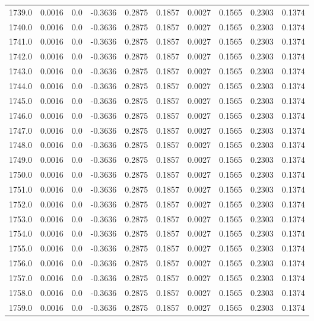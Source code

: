 \begin{longtable}{lrrrrrrrrr}
1739.0 & 0.0016 & 0.0 & -0.3636 & 0.2875 & 0.1857 & 0.0027 & 0.1565 & 0.2303 & 0.1374 \\
1740.0 & 0.0016 & 0.0 & -0.3636 & 0.2875 & 0.1857 & 0.0027 & 0.1565 & 0.2303 & 0.1374 \\
1741.0 & 0.0016 & 0.0 & -0.3636 & 0.2875 & 0.1857 & 0.0027 & 0.1565 & 0.2303 & 0.1374 \\
1742.0 & 0.0016 & 0.0 & -0.3636 & 0.2875 & 0.1857 & 0.0027 & 0.1565 & 0.2303 & 0.1374 \\
1743.0 & 0.0016 & 0.0 & -0.3636 & 0.2875 & 0.1857 & 0.0027 & 0.1565 & 0.2303 & 0.1374 \\
1744.0 & 0.0016 & 0.0 & -0.3636 & 0.2875 & 0.1857 & 0.0027 & 0.1565 & 0.2303 & 0.1374 \\
1745.0 & 0.0016 & 0.0 & -0.3636 & 0.2875 & 0.1857 & 0.0027 & 0.1565 & 0.2303 & 0.1374 \\
1746.0 & 0.0016 & 0.0 & -0.3636 & 0.2875 & 0.1857 & 0.0027 & 0.1565 & 0.2303 & 0.1374 \\
1747.0 & 0.0016 & 0.0 & -0.3636 & 0.2875 & 0.1857 & 0.0027 & 0.1565 & 0.2303 & 0.1374 \\
1748.0 & 0.0016 & 0.0 & -0.3636 & 0.2875 & 0.1857 & 0.0027 & 0.1565 & 0.2303 & 0.1374 \\
1749.0 & 0.0016 & 0.0 & -0.3636 & 0.2875 & 0.1857 & 0.0027 & 0.1565 & 0.2303 & 0.1374 \\
1750.0 & 0.0016 & 0.0 & -0.3636 & 0.2875 & 0.1857 & 0.0027 & 0.1565 & 0.2303 & 0.1374 \\
1751.0 & 0.0016 & 0.0 & -0.3636 & 0.2875 & 0.1857 & 0.0027 & 0.1565 & 0.2303 & 0.1374 \\
1752.0 & 0.0016 & 0.0 & -0.3636 & 0.2875 & 0.1857 & 0.0027 & 0.1565 & 0.2303 & 0.1374 \\
1753.0 & 0.0016 & 0.0 & -0.3636 & 0.2875 & 0.1857 & 0.0027 & 0.1565 & 0.2303 & 0.1374 \\
1754.0 & 0.0016 & 0.0 & -0.3636 & 0.2875 & 0.1857 & 0.0027 & 0.1565 & 0.2303 & 0.1374 \\
1755.0 & 0.0016 & 0.0 & -0.3636 & 0.2875 & 0.1857 & 0.0027 & 0.1565 & 0.2303 & 0.1374 \\
1756.0 & 0.0016 & 0.0 & -0.3636 & 0.2875 & 0.1857 & 0.0027 & 0.1565 & 0.2303 & 0.1374 \\
1757.0 & 0.0016 & 0.0 & -0.3636 & 0.2875 & 0.1857 & 0.0027 & 0.1565 & 0.2303 & 0.1374 \\
1758.0 & 0.0016 & 0.0 & -0.3636 & 0.2875 & 0.1857 & 0.0027 & 0.1565 & 0.2303 & 0.1374 \\
1759.0 & 0.0016 & 0.0 & -0.3636 & 0.2875 & 0.1857 & 0.0027 & 0.1565 & 0.2303 & 0.1374 \\

\end{longtable}
